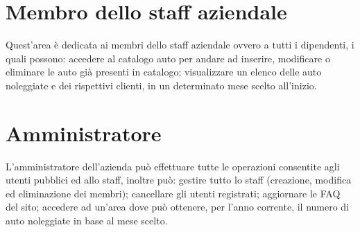 \documentclass[12pt,a4paperS]{report}
\begin{document}
\begin{normalsize}
			\section{Membro dello staff aziendale}
				Quest'area è dedicata ai membri dello staff aziendale ovvero a tutti i dipendenti, i quali possono: accedere al catalogo auto per andare ad inserire, modificare o eliminare le auto già presenti in catalogo; visualizzare un elenco delle auto noleggiate e dei rispettivi clienti, in un determinato mese scelto all'inizio.
			
			\section{Amministratore}
				L'amministratore dell'azienda può effettuare tutte le operazioni consentite agli utenti pubblici ed allo staff, inoltre può: gestire tutto lo staff (creazione, modifica ed eliminazione dei membri); cancellare gli utenti registrati; aggiornare le FAQ del sito; accedere ad un'area dove può ottenere, per l'anno corrente, il numero di auto noleggiate in base al mese scelto.
		\end{normalsize}
		
\end{document}
